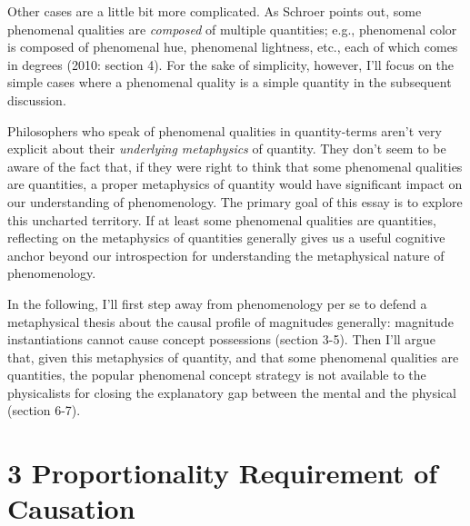 \documentclass[a4paper,12pt]{article}
\begin{document}

Other cases are a little bit more complicated. As Schroer points out, some phenomenal qualities are \emph{composed} of multiple quantities; e.g., phenomenal color is composed of phenomenal hue, phenomenal lightness, etc., each of which comes in degrees (2010: section 4). For the sake of simplicity, however, I'll focus on the simple cases where a phenomenal quality is a simple quantity in the subsequent discussion.

Philosophers who speak of phenomenal qualities in quantity-terms aren't very explicit about their \emph{underlying metaphysics} of quantity. They don't seem to be aware of the fact that, if they were right to think that some phenomenal qualities are quantities, a proper metaphysics of quantity would have significant impact on our understanding of phenomenology. The primary goal of this essay is to explore this uncharted territory. If at least some phenomenal qualities are quantities, reflecting on the metaphysics of quantities generally gives us a useful cognitive anchor beyond our introspection for understanding the metaphysical nature of phenomenology.

In the following, I'll first step away from phenomenology per se to defend a metaphysical thesis about the causal profile of magnitudes generally: magnitude instantiations cannot cause concept possessions (section 3-5). Then I'll argue that, given this metaphysics of quantity, and that some phenomenal qualities are quantities, the popular phenomenal concept strategy is not available to the physicalists for closing the explanatory gap between the mental and the physical (section 6-7).

\section*{3 Proportionality Requirement of Causation}
\end{document}
